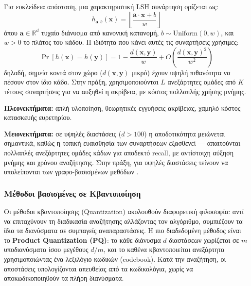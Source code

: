 \documentclass[12pt,a4paper]{article}
\begin{document}
Για ευκλείδεια απόσταση, μια χαρακτηριστική LSH συνάρτηση ορίζεται ως:
\[
h_{\mathbf{a}, b}(\mathbf{x}) = \left\lfloor \frac{\mathbf{a} \cdot \mathbf{x} + b}{w} \right\rfloor
\]
όπου $\mathbf{a} \in \mathbb{R}^d$ τυχαίο διάνυσμα από κανονική κατανομή, $b \sim \text{Uniform}(0, w)$, και $w > 0$ το πλάτος του κάδου. Η ιδιότητα που κάνει αυτές τις συναρτήσεις χρήσιμες:
\[
\Pr[h(\mathbf{x}) = h(\mathbf{y})] = 1 - \frac{d(\mathbf{x},\mathbf{y})}{w} + O\!\left(\frac{d(\mathbf{x},\mathbf{y})^2}{w^2}\right)
\]
δηλαδή, σημεία κοντά στον χώρο ($d(\mathbf{x},\mathbf{y})$ μικρό) έχουν υψηλή πιθανότητα να πέσουν στον ίδιο κάδο. Στην πράξη, χρησιμοποιούνται $L$ ανεξάρτητες ομάδες από $K$ τέτοιες συναρτήσεις για να αυξηθεί η ακρίβεια, με κόστος πολλαπλής χρήσης μνήμης.

\textbf{Πλεονεκτήματα:} απλή υλοποίηση, θεωρητικές εγγυήσεις ακρίβειας, χαμηλό κόστος κατασκευής ευρετηρίου.

\textbf{Μειονεκτήματα:} σε υψηλές διαστάσεις ($d > 100$) η αποδοτικότητα μειώνεται σημαντικά, καθώς η τοπική ευαισθησία των συναρτήσεων εξασθενεί --- απαιτούνται πολλαπλές ανεξάρτητες ομάδες κάδων για αποδεκτό recall, με αντίστοιχη αύξηση μνήμης και χρόνου αναζήτησης. Στην πράξη, για υψηλές διαστάσεις τείνουν να υπολείπονται των γραφο-βασισμένων μεθόδων \cite{nns_survey}.

\subsubsection{Μέθοδοι βασισμένες σε Κβαντοποίηση}

Οι μέθοδοι κβαντοποίησης (Quantization) ακολουθούν διαφορετική φιλοσοφία: αντί να επιταχύνουν τη διαδικασία αναζήτησης αλλάζοντας τον αλγόριθμο, συμπιέζουν τα ίδια τα διανύσματα σε συμπαγείς αναπαραστάσεις. Η πιο διαδεδομένη μέθοδος είναι το \textbf{Product Quantization (PQ)}: το κάθε διάνυσμα $d$ διαστάσεων χωρίζεται σε $m$ υποδιανύσματα ίσου μεγέθους $d/m$, και το καθένα κβαντοποιείται ανεξάρτητα χρησιμοποιώντας ένα λεξιλόγιο κωδικών (codebook). Κατά την αναζήτηση, οι αποστάσεις υπολογίζονται απευθείας από τα κωδικολόγια, χωρίς να αποκωδικοποιηθούν τα πλήρη διανύσματα.
\end{document}
